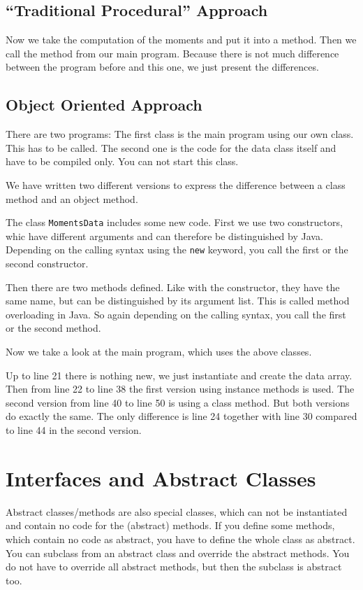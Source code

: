\subsection{``Traditional Procedural'' Approach}
Now we take the computation of the moments and put it into
a method. Then we call the method from our main program. 
Because there is not much difference between the program before
and this one, we just present the differences.




\subsection{Object Oriented Approach}
There are two programs: The first class is
the main program using our own class. This has to be called.
The second one is the
code for the data class itself and have to be compiled only. You can
not start this class. 

We have written two different 
versions to express the difference between a class method and 
an object method.

The class \verb|MomentsData| includes some new code. First
we use two constructors, whic have different arguments and can
therefore be distinguished by Java. Depending on the calling
syntax using the \verb|new| keyword, you call the first or the second
constructor. 

Then there are two methods defined. Like with the constructor, they
have the same name, but can be distinguished by its argument list.
This is called method overloading in Java. So again depending on
the calling syntax, you call the first or the second method.

Now we take a look at the main program, which uses the above classes.

Up to line 21 there is nothing new, we just instantiate and create
the data array. Then from line 22 to line 38 the first version using
instance methods is used. The second version from line 40 to line 50
is using a class method. But both versions do exactly the same.
The only difference is line 24 together with line 30 compared to 
line 44 in the second version.
 


\section{Interfaces and Abstract Classes}
\label{sec:AbstractClasses}
Abstract classes/methods 
are also special classes, which can not be instantiated
and contain no code for the (abstract) methods. If you define
some methods, which contain no code as abstract, you have to 
define the whole class as abstract. You can subclass from an 
abstract class and override the abstract methods. You do not have
to override all abstract methods, but then the subclass is abstract
too.

